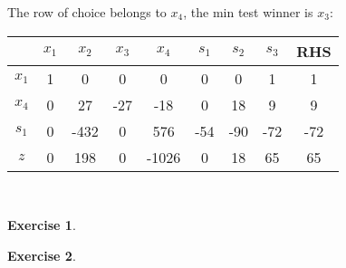 \documentclass[a4paper,12pt,headsepline]{scrartcl}
\newtheorem{aufgabe}{Exercise}
\begin{document}
The row of choice belongs to $x_4$, the min test winner is $x_3$:\\
\begin{tabular}{c|c|c|c|c|c|c|c|c|}
     & $x_1$ & $x_2$ & $x_3$ & $x_4$ & $s_1$ & $s_2$ & $s_3$ & RHS  \\
\hline   $x_1$ & 1& 0 &0 & 0 & 0&0 & 1 & 1\\
\hline $x_4$ & 0 & 27 & -27 & -18 &0 & 18 & 9 & 9\\
\hline $s_1$ & 0 & -432 &0 &576 & -54 & -90 & -72 & -72\\
\hline \hline $z$ & 0 & 198 & 0 & -1026 & 0 & 18 & 65 & 65\\
\hline 
\end{tabular}\\

\newpage
\begin{aufgabe}
\end{aufgabe}



\newpage
\begin{aufgabe}
\end{aufgabe}
\end{document}
